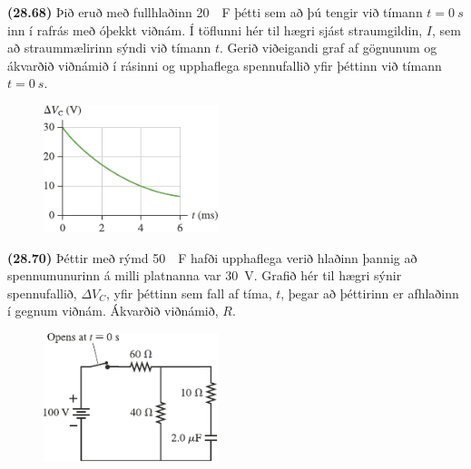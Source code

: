 \ifdefined \wholebook \else\documentclass[oneside]{book}\usepackage{EdlBook}\graphicspath{{figures/}}
\begin{document}
\begin{enumerate}[label = \textbf{(\alph*)}]
\begin{minipage}{\linewidth}
\item[\textbf{(28.68)}] Þið eruð með fullhlaðinn \SI{20}{\mu F} þétti sem að þú tengir við tímann $t = \SI{0}{s}$ inn í rafrás með óþekkt viðnám. Í töflunni hér til hægri sjást straumgildin, $I$, sem að straummælirinn sýndi við tímann $t$. Gerið viðeigandi graf af gögnunum og ákvarðið viðnámið í rásinni og upphaflega spennufallið yfir þéttinn við tímann $t = \SI{0}{s}$.

\end{minipage}

\vspace{1cm}

\begin{minipage}{\linewidth}
\begin{figure}
\vspace{-0.5cm}
\includegraphics[width = 2in]{figures/rk2870.pdf}
\end{figure}

\item[\textbf{(28.70)}] Þéttir með rýmd \SI{50}{\mu F} hafði upphaflega verið hlaðinn þannig að spennumunurinn á milli platnanna var \SI{30}{V}. Grafið hér til hægri sýnir spennufallið, $\Delta V_C$, yfir þéttinn sem fall af tíma, $t$, þegar að þéttirinn er afhlaðinn í gegnum viðnám. Ákvarðið viðnámið, $R$.
\end{minipage}

\vspace{3cm}

\begin{minipage}{\linewidth}
\begin{figure}
\vspace{-0.5cm}
\includegraphics[width = 2in]{figures/rk2880.pdf}
\end{figure}


\end{minipage}
\end{enumerate}
\end{document}
